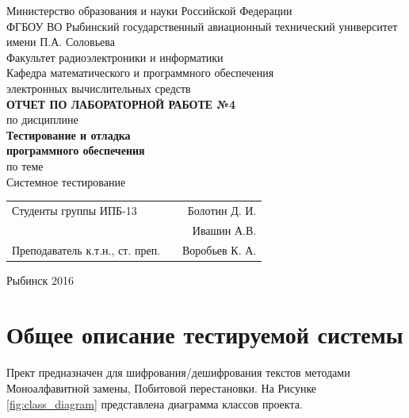 \documentclass[a4paper,12pt]{article}
\begin{document}
\begin{titlepage}
\newpage


\begin{center}
	\large		
   	Министерство образования и науки Российской Федерации\\[0.5cm]
    	
	ФГБОУ ВО Рыбинский государственный авиационный технический университет имени П.А. Соловьева\\[1.0cm]

	Факультет радиоэлектроники и информатики\\[0.25cm]
		
	Кафедра математического и программного обеспечения\\ электронных вычислительных средств\\[1.5cm]
	
	\Large
	\textbf{\textsc{ОТЧЕТ ПО ЛАБОРАТОРНОЙ РАБОТЕ №4}}\\[0.25cm]
	по  дисциплине\\
	\textbf{Тестирование и отладка\\ программного обеспечения}\\[0.5cm]
	
	по теме\\
	Системное тестирование
	
\end{center}

\vfill	
\begin{tabularx}{0.95\textwidth}{lXr}
Студенты группы ИПБ-13 			& &	Болотин Д. И.\\
								& &	Ивашин А.В. \\
Преподаватель к.т.н., ст. преп.	& & Воробьев К. А.\\
\end{tabularx}

\vspace{1.5cm}
\center Рыбинск 2016
\end{titlepage}	


\newpage
\setcounter{page}{2}

\tableofcontents

\newpage\section{Общее описание тестируемой системы}

Прект предназначен для шифрования/дешифрования текстов методами Моноалфавитной замены, Побитовой перестановки.
На Рисунке \ref{fig:class_diagram} представлена  диаграмма классов проекта.
\end{document}

